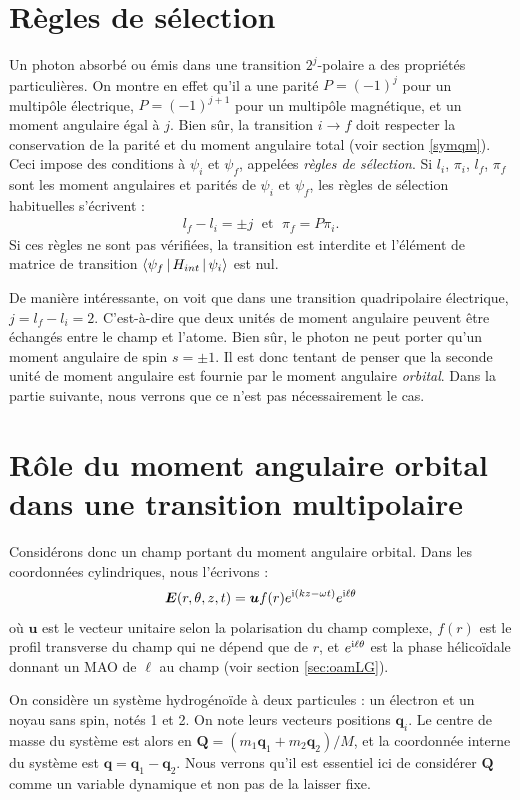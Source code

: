 \section{Règles de sélection}
Un photon absorbé ou émis dans une transition $2^j$-polaire a des propriétés particulières. On montre en effet  qu'il a une parité $P=(-1)^j$ pour un multipôle électrique, $P=(-1)^{j+1}$ pour un multipôle magnétique, et un moment angulaire égal à $j$. Bien sûr, la transition $i\rightarrow f$ doit respecter la conservation de la parité et du moment angulaire total (voir section \ref{symqm}). Ceci impose des conditions à $\psi_i$ et $\psi_f$, appelées \textit{règles de sélection}. Si $l_i$, $\pi_i$, $l_f$, $\pi_f$ sont les moment angulaires et parités de $\psi_i$ et $\psi_f$, les règles de sélection habituelles s'écrivent  :
\begin{align}
l_f-l_i=\pm j\;\text{ et }\;\pi_f=P\pi_i.
\end{align}
Si ces règles ne sont pas vérifiées, la transition est interdite et l'élément de matrice de transition $\Braket{\psi_f|H_{int}|\psi_i}$ est nul.

De manière intéressante, on voit que dans une transition quadripolaire électrique, $j=l_f-l_i=2$. C'est-à-dire que deux unités de moment angulaire peuvent être échangés entre le champ et l'atome. Bien sûr, le photon ne peut porter qu'un moment angulaire de spin $s=\pm 1$. Il est donc tentant de penser que la seconde unité de moment angulaire est fournie par le moment angulaire \textit{orbital}. Dans la partie suivante, nous verrons que ce n'est pas nécessairement le cas.

\section{Rôle du moment angulaire orbital dans une transition multipolaire}
Considérons donc un champ portant du moment angulaire orbital. Dans les coordonnées cylindriques, nous l'écrivons :
\[\bm{E}(r,\theta,z,t) = \bm{u} f(r)e^{\mathrm{i}(kz-\omega t)}e^{\mathrm{i}\ell\theta}\]
où $\bm{u}$ est le vecteur unitaire selon la polarisation du champ complexe, $f(r)$ est le profil transverse du champ qui ne dépend que de $r$, et $e^{\mathrm{i}\ell\theta}$ est la phase hélicoïdale donnant un MAO de $\ell$ au champ (voir section \ref{sec:oamLG}).

On considère un système hydrogénoïde à deux particules : un électron et un noyau sans spin, notés 1 et 2. On note leurs vecteurs positions $\bm{q}_i$. Le centre de masse du système est alors en $\bm{Q} = (m_1 \bm{q}_1+m_2 \bm{q}_2)/M$, et la coordonnée interne du système est $\bm{q} = \bm{q}_1-\bm{q}_2$. Nous verrons qu'il est essentiel ici de considérer $\bm{Q}$ comme un variable dynamique et non pas de la laisser fixe.

